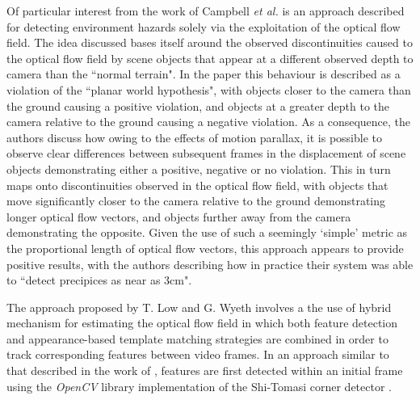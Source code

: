 
Of particular interest from the work of Campbell \textit{et al.} \cite{campbell} is an approach described for detecting environment hazards solely via the exploitation of the optical flow field. The idea discussed bases itself around the observed discontinuities caused to the optical flow field by scene objects that appear at a different observed depth to camera than the ``normal terrain". In the paper this behaviour is described as a violation of the ``planar world hypothesis", with objects closer to the camera than the ground causing a positive violation, and objects at a greater depth to the camera relative to the ground causing a negative violation. As a consequence, the authors discuss how owing to the effects of motion parallax, it is possible to observe clear differences between subsequent frames in the displacement of scene objects demonstrating either a positive, negative or no violation. This in turn maps onto discontinuities observed in the optical flow field, with objects that move significantly closer to the camera relative to the ground demonstrating longer optical flow vectors, and objects further away from the camera demonstrating the opposite. Given the use of such a seemingly `simple' metric as the proportional length of optical flow vectors, this approach appears to provide positive results, with the authors describing how in practice their system was able to ``detect precipices as near as 3cm". 

The approach proposed by T. Low and G. Wyeth \cite{low-wyeth} involves a the use of hybrid mechanism for estimating the optical flow field in which both feature detection and appearance-based template matching strategies are combined in order to track corresponding features between video frames. In an approach similar to that described in the work of \cite{campbell}, features are first detected within an initial frame using the \textit{OpenCV} library implementation \cite{opencv-good-features-to-track} of the Shi-Tomasi corner detector \cite{shi-tomasi-good-features-to-track}. 


